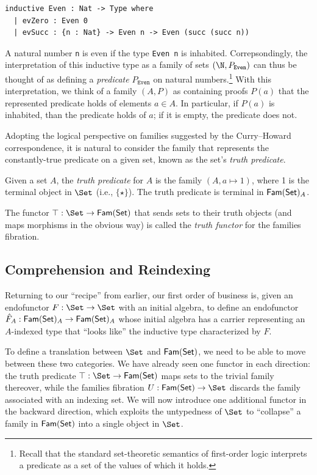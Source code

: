 \begin{lstlisting}
inductive Even : Nat -> Type where
  | evZero : Even 0
  | evSucc : {n : Nat} -> Even n -> Even (succ (succ n))
\end{lstlisting}

A natural number \texttt{n} is even if the type \texttt{Even n} is inhabited. Correpsondingly, the
interpretation of this inductive type as a family of sets $(\N, P_\mathtt{Even})$ can thus be
thought of as defining a \emph{predicate} $P_\mathtt{Even}$ on natural numbers.\footnote{Recall that
the standard set-theoretic semantics of first-order logic interprets a predicate as a set of the
values of which it holds.} With this interpretation, we think of a family $(A, P)$ as containing
proofs $P(a)$ that the represented predicate holds of elements $a \in A$. In particular, if $P(a)$
is inhabited, than the predicate holds of $a$; if it is empty, the predicate does not.

Adopting the logical perspective on families suggested by the Curry--Howard correspondence, it is
natural to consider the family that represents the constantly-true predicate on a given set, known
as the set's \emph{truth predicate}.
\begin{definition}
\sloppy
  Given a set $A$, the \emph{truth predicate} for $A$ is the family $(A, a \mapsto 1)$, where 1 is
  the terminal object in $\Set$ (i.e., $\{\star\}$). The truth predicate is terminal in $\mathsf{Fam}(\mathsf{Set})_A$.

  The functor $\top : \Set \to \FamSet$ that sends sets to their truth objects (and maps morphisms
  in the obvious way) is called the \emph{truth functor} for the families fibration.
\end{definition}

\subsection{Comprehension and Reindexing}

Returning to our ``recipe'' from earlier, our first order of business is, given an endofunctor $F :
\Set \to \Set$ with an initial algebra, to define an endofunctor $\hat F_A : \mathsf{Fam}(\mathsf{Set})_A \to
\mathsf{Fam}(\mathsf{Set})_A$ whose initial algebra has a carrier representing an $A$-indexed type that ``looks like''
the inductive type characterized by $F$.

To define a translation between $\Set$ and $\mathsf{Fam}(\mathsf{Set})$, we need to be able to move between these two
categories. We have already seen one functor in each direction: the truth predicate $\top : \Set \to
\FamSet$ maps sets to the trivial family thereover, while the families fibration $U : \FamSet \to
\Set$ discards the family associated with an indexing set. We will now introduce one additional
functor in the backward direction, which exploits the untypedness of $\Set$ to ``collapse'' a family
in $\mathsf{Fam}(\mathsf{Set})$ into a single object in $\Set$.

